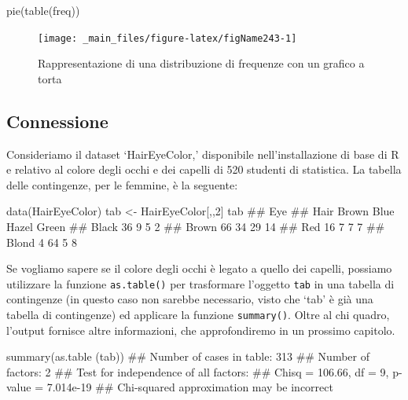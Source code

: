 \documentclass[a4paper,12pt,oneside]{book}
\newenvironment{Shaded}{\begin{snugshade}}{\end{snugshade}}
\newcommand{\DecValTok}[1]{#1}
\newcommand{\DocumentationTok}[1]{#1}
\newcommand{\OtherTok}[1]{#1}
\newcommand{\FunctionTok}[1]{#1}
\newcommand{\NormalTok}[1]{#1}
\begin{document}
\begin{Shaded}
\begin{Highlighting}[]
\FunctionTok{pie}\NormalTok{(}\FunctionTok{table}\NormalTok{(freq))}
\end{Highlighting}
\end{Shaded}

\begin{figure}

{\centering \texttt{[image: \_main\_files/figure-latex/figName243-1]} 

}

\caption{Rappresentazione di una distribuzione di frequenze con un grafico a torta}\label{fig:figName243}
\end{figure}

\hypertarget{connessione-1}{%
\subsection{Connessione}\label{connessione-1}}

Consideriamo il dataset `HairEyeColor,' disponibile nell'installazione di base di R e relativo al colore degli occhi e dei capelli di 520 studenti di statistica. La tabella delle contingenze, per le femmine, è la seguente:

\begin{Shaded}
\begin{Highlighting}[]
\FunctionTok{data}\NormalTok{(HairEyeColor)}
\NormalTok{tab }\OtherTok{\textless{}{-}}\NormalTok{ HairEyeColor[,,}\DecValTok{2}\NormalTok{]}
\NormalTok{tab}
\DocumentationTok{\#\#        Eye}
\DocumentationTok{\#\# Hair    Brown Blue Hazel Green}
\DocumentationTok{\#\#   Black    36    9     5     2}
\DocumentationTok{\#\#   Brown    66   34    29    14}
\DocumentationTok{\#\#   Red      16    7     7     7}
\DocumentationTok{\#\#   Blond     4   64     5     8}
\end{Highlighting}
\end{Shaded}

Se vogliamo sapere se il colore degli occhi è legato a quello dei capelli, possiamo utilizzare la funzione \texttt{as.table()} per trasformare l'oggetto \texttt{tab} in una tabella di contingenze (in questo caso non sarebbe necessario, visto che `tab' è già una tabella di contingenze) ed applicare la funzione \texttt{summary()}. Oltre al chi quadro, l'output fornisce altre informazioni, che approfondiremo in un prossimo capitolo.

\begin{Shaded}
\begin{Highlighting}[]
\FunctionTok{summary}\NormalTok{(}\FunctionTok{as.table}\NormalTok{ (tab))}
\DocumentationTok{\#\# Number of cases in table: 313 }
\DocumentationTok{\#\# Number of factors: 2 }
\DocumentationTok{\#\# Test for independence of all factors:}
\DocumentationTok{\#\#  Chisq = 106.66, df = 9, p{-}value = 7.014e{-}19}
\DocumentationTok{\#\#  Chi{-}squared approximation may be incorrect}
\end{Highlighting}
\end{Shaded}
\end{document}
